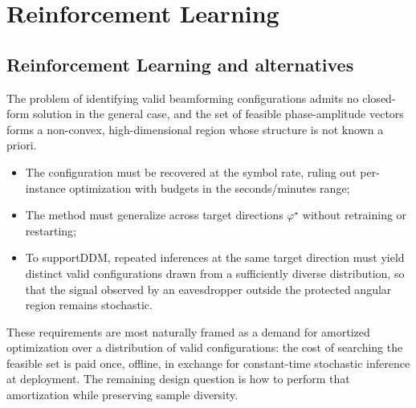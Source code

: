 \section{Reinforcement Learning}
\label{sec:reinforcement_learning}

\subsection{Reinforcement Learning and alternatives}
The problem of identifying valid beamforming configurations admits no closed-form solution in the general case, and the set of feasible phase-amplitude vectors forms a non-convex, high-dimensional region whose structure is not known a priori.
\begin{itemize}
    \item The configuration must be recovered at the symbol rate, ruling out per-instance optimization with budgets in the seconds/minutes range;
    \item The method must generalize across target directions $\varphi^\star$ without retraining or restarting;
    \item To support\gls{DDM}, repeated inferences at the same target direction must yield distinct valid configurations drawn from a sufficiently diverse distribution, so that the signal observed by an eavesdropper outside the protected angular region remains stochastic.
\end{itemize}
These requirements are most naturally framed as a demand for amortized optimization over a distribution of valid configurations: the cost of searching the feasible set is paid once, offline, in exchange for constant-time stochastic inference at deployment. The remaining design question is how to perform that amortization while preserving sample diversity.
